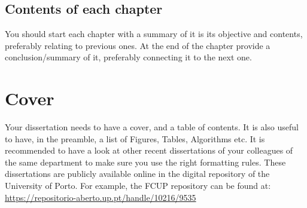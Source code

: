 \subsection{Contents of each chapter}
You should start each chapter with a summary of it is its objective and contents, preferably relating to previous ones. At the end of the chapter provide a conclusion/summary of it, preferably connecting it to the next one.

\section{Cover}
 Your dissertation needs to have a cover, and a table of contents. It is also useful to have, in the
preamble, a list of Figures, Tables, Algorithms etc. It is recommended to have a look at other recent
dissertations of your colleagues of the same department to make sure you use the right formatting
rules. These dissertations are publicly available online in the digital repository of the University of
Porto. For example, the FCUP repository can be found at:
\url{https://repositorio-aberto.up.pt/handle/10216/9535}
